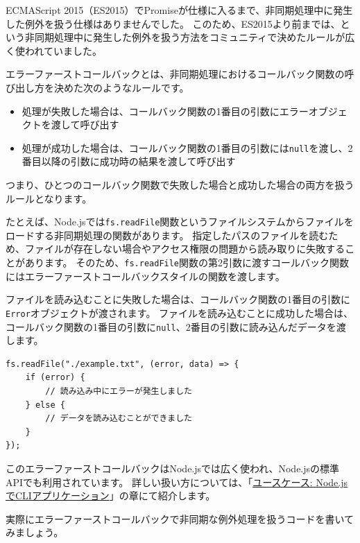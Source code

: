 \begin{tcolorbox}[enhanced jigsaw,breakable,title=エラーファーストコールバック]\label{error-first-callback}

ECMAScript 2015（ES2015）でPromiseが仕様に入るまで、非同期処理中に発生した例外を扱う仕様はありませんでした。
このため、ES2015より前までは、\textbf{}という非同期処理中に発生した例外を扱う方法をコミュニティで決めたルールが広く使われていました。

エラーファーストコールバックとは、非同期処理におけるコールバック関数の呼び出し方を決めた次のようなルールです。

\begin{itemize}
\item
  処理が失敗した場合は、コールバック関数の1番目の引数にエラーオブジェクトを渡して呼び出す
\item
  処理が成功した場合は、コールバック関数の1番目の引数には\texttt{null}を渡し、2番目以降の引数に成功時の結果を渡して呼び出す
\end{itemize}

つまり、ひとつのコールバック関数で失敗した場合と成功した場合の両方を扱うルールとなります。

たとえば、Node.jsでは\texttt{fs.readFile}関数というファイルシステムからファイルをロードする非同期処理の関数があります。
指定したパスのファイルを読むため、ファイルが存在しない場合やアクセス権限の問題から読み取りに失敗することがあります。
そのため、\texttt{fs.readFile}関数の第2引数に渡すコールバック関数にはエラーファーストコールバックスタイルの関数を渡します。

ファイルを読み込むことに失敗した場合は、コールバック関数の1番目の引数に\texttt{Error}オブジェクトが渡されます。
ファイルを読み込むことに成功した場合は、コールバック関数の1番目の引数に\texttt{null}、2番目の引数に読み込んだデータを渡します。

\begin{lstlisting}
fs.readFile("./example.txt", (error, data) => {
    if (error) {
        // 読み込み中にエラーが発生しました
    } else {
        // データを読み込むことができました
    }
});
\end{lstlisting}

このエラーファーストコールバックはNode.jsでは広く使われ、Node.jsの標準APIでも利用されています。
詳しい扱い方については、「\hyperlink{node-cli}{ユースケース: Node.jsでCLIアプリケーション}」の章にて紹介します。

実際にエラーファーストコールバックで非同期な例外処理を扱うコードを書いてみましょう。


\end{tcolorbox}
